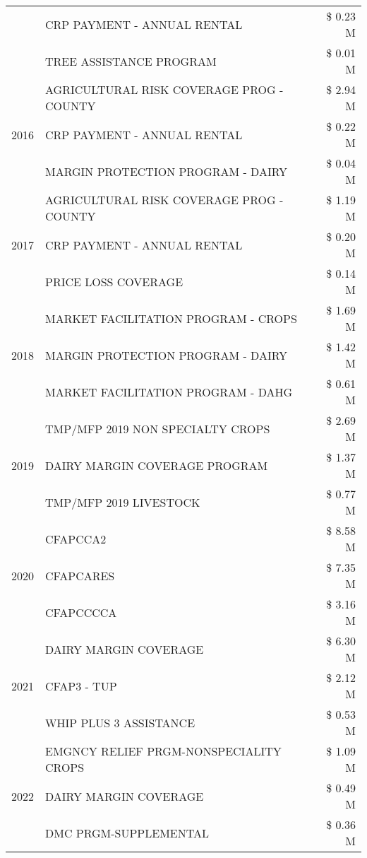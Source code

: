 \begin{tabular}{llr}
 & CRP PAYMENT - ANNUAL RENTAL & \$ 0.23 M \\
 & TREE ASSISTANCE PROGRAM & \$ 0.01 M \\
\cline{1-3}
\multirow[t]{3}{*}{2016} & AGRICULTURAL RISK COVERAGE PROG - COUNTY & \$ 2.94 M \\
 & CRP PAYMENT - ANNUAL RENTAL & \$ 0.22 M \\
 & MARGIN PROTECTION PROGRAM - DAIRY & \$ 0.04 M \\
\cline{1-3}
\multirow[t]{3}{*}{2017} & AGRICULTURAL RISK COVERAGE PROG - COUNTY & \$ 1.19 M \\
 & CRP PAYMENT - ANNUAL RENTAL & \$ 0.20 M \\
 & PRICE LOSS COVERAGE & \$ 0.14 M \\
\cline{1-3}
\multirow[t]{3}{*}{2018} & MARKET FACILITATION PROGRAM - CROPS & \$ 1.69 M \\
 & MARGIN PROTECTION PROGRAM - DAIRY & \$ 1.42 M \\
 & MARKET FACILITATION PROGRAM - DAHG & \$ 0.61 M \\
\cline{1-3}
\multirow[t]{3}{*}{2019} & TMP/MFP 2019 NON SPECIALTY CROPS & \$ 2.69 M \\
 & DAIRY MARGIN COVERAGE PROGRAM & \$ 1.37 M \\
 & TMP/MFP 2019 LIVESTOCK & \$ 0.77 M \\
\cline{1-3}
\multirow[t]{3}{*}{2020} & CFAPCCA2 & \$ 8.58 M \\
 & CFAPCARES & \$ 7.35 M \\
 & CFAPCCCCA & \$ 3.16 M \\
\cline{1-3}
\multirow[t]{3}{*}{2021} & DAIRY MARGIN COVERAGE & \$ 6.30 M \\
 & CFAP3 - TUP & \$ 2.12 M \\
 & WHIP PLUS 3 ASSISTANCE & \$ 0.53 M \\
\cline{1-3}
\multirow[t]{3}{*}{2022} & EMGNCY RELIEF PRGM-NONSPECIALITY CROPS & \$ 1.09 M \\
 & DAIRY MARGIN COVERAGE & \$ 0.49 M \\
 & DMC PRGM-SUPPLEMENTAL & \$ 0.36 M \\
\cline{1-3}
\bottomrule
\end{tabular}
